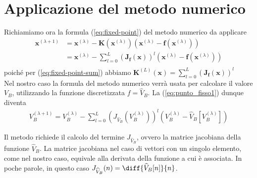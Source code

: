	\section{Applicazione del metodo numerico}
		Richiamiamo ora la formula (\ref{eq:fixed-point}) del metodo numerico da applicare
		\begin{equation}
			\label{eq:punto_fisso1}
			\begin{split}
				\mathbf{x}^{(\lambda+1)} &= \mathbf{x}^{(\lambda)}-\mathbf{K}(\mathbf{x}^{(\lambda)})(\mathbf{x}^{(\lambda)}-\mathbf{f}(\mathbf{x}^{(\lambda)}))\\
				&= \mathbf{x}^{(\lambda)}-\sum_{l=0}^{L} \left(\mathbf{J_{f}(x)}\right)^{l}(\mathbf{x}^{(\lambda)}-\mathbf{f}(\mathbf{x}^{(\lambda)}))\\
			\end{split}
		\end{equation}
		poiché per (\ref{eq:fixed-point-sum}) abbiamo $\mathbf{K}^{(L)}(\mathbf{x}) = \sum_{l=0}^{L} \left(\mathbf{J_{f}(x)}\right)^{l}$\\
		
		Nel nostro caso la formula del metodo numerico verrà usata per calcolare il valore $V_{B}$, utilizzando la funzione discretizzata $f = \widehat V_{B}$. La (\ref{eq:punto_fisso1}) dunque diventa
		\begin{equation}
			\label{eq:punto_fisso2}
			\begin{split}
				V_{B}^{(\lambda+1)} = V_{B}^{(\lambda)}-\sum_{l=0}^{L} \left(J_{\widehat V_{B}}(V_{B}^{(\lambda)})\right)^{l}(V_{B}^{(\lambda)}-\widehat V_{B}[V_{B}^{(\lambda)}])
			\end{split}
		\end{equation}
		
		Il metodo richiede il calcolo del termine $J_{\widehat V_{B}}$, ovvero la matrice jacobiana della funzione $\widehat V_{B}$. La matrice jacobiana nel caso di vettori con un singolo elemento, come nel nostro caso, equivale alla derivata della funzione a cui è associata. In poche parole, in questo caso $J_{\widehat V_{B}}(n) = \diff{\widehat V_{B}[n]}{n}$.\\
		
